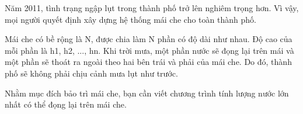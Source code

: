 Năm 2011, tình trạng ngập lụt trong thành phố trở lên nghiêm trọng hơn. Vì vậy, mọi người quyết định xây dựng hệ thống mái che cho toàn thành phố.  




   Mái che có bề rộng là N, được chia làm N phần có độ dài như nhau. Độ cao của mỗi phần là h1, h2, ..., hn. Khi trời mưa, một phần nước sẽ đọng lại trên mái và một phần sẽ thoát ra ngoài theo hai bên trái và phải của mái che. Do đó, thành phố sẽ không phải chịu cảnh mưa lụt như trước.  




   Nhằm mục đích bảo trì mái che, bạn cần viết chương trình tính lượng nước lớn nhất có thể đọng lại trên mái che.